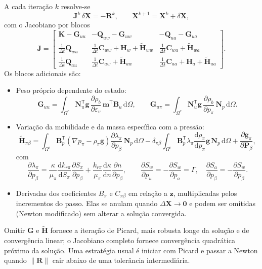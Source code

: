 \documentclass[11pt,a4paper]{article}
\numberwithin{equation}{section}
\newcommand{\dd}{\mathrm{d}}
\begin{document}
A cada iteração $k$ resolve-se
\begin{equation}
\boxed{\mathbf J^{k}\,\delta\mathbf X=-\mathbf R^{k},\qquad
\mathbf X^{k+1}=\mathbf X^{k}+\delta\mathbf X,}
\end{equation}
com o Jacobiano por blocos
\begin{equation}
\boxed{\mathbf J=\begin{bmatrix}
\mathbf K-\mathbf G_{uu}&-\mathbf Q_{uw}-\mathbf G_{uw}&-\mathbf Q_{ua}-\mathbf G_{ua}\\[3pt]
\tfrac{1}{\Delta t}\mathbf Q_{wu}&\tfrac{1}{\Delta t}\mathbf C_{ww}+\mathbf H_w+\tilde{\mathbf H}_{ww}&\tfrac{1}{\Delta t}\mathbf C_{wa}+\tilde{\mathbf H}_{wa}\\[3pt]
\tfrac{1}{\Delta t}\mathbf Q_{au}&\tfrac{1}{\Delta t}\mathbf C_{aw}+\tilde{\mathbf H}_{aw}&\tfrac{1}{\Delta t}\mathbf C_{aa}+\mathbf H_a+\tilde{\mathbf H}_{aa}
\end{bmatrix}.}
\end{equation}
Os blocos adicionais são:
\begin{itemize}
\item Peso próprio dependente do estado:
\begin{equation}
\mathbf G_{uu}=\int_{\Omega^e}\mathbf N_u^{\mathsf T}\mathbf g\,
\frac{\partial\rho_b}{\partial\varepsilon_v}\,\mathbf m^{\mathsf T}\mathbf B_u\,\dd\Omega,\qquad
\mathbf G_{u\pi}=\int_{\Omega^e}\mathbf N_u^{\mathsf T}\mathbf g\,
\frac{\partial\rho_b}{\partial p_\pi}\,\mathbf N_p\,\dd\Omega .
\end{equation}
\item Variação da mobilidade e da massa específica com a pressão:
\begin{equation}
\tilde{\mathbf H}_{\pi\beta}=\int_{\Omega^e}\mathbf B_p^{\mathsf T}
\left(\nabla p_\pi-\rho_\pi\mathbf g\right)\frac{\partial\lambda_\pi}{\partial p_\beta}\,\mathbf N_p\,\dd\Omega
-\delta_{\pi\beta}\int_{\Omega^e}\mathbf B_p^{\mathsf T}\lambda_\pi\frac{\dd\rho_\pi}{\dd p_\pi}\mathbf g\,\mathbf N_p\,\dd\Omega
+\frac{\partial\mathbf g_\pi}{\partial\mathbf P_\beta},
\end{equation}
com
\begin{equation}
\frac{\partial\lambda_\pi}{\partial p_\beta}
=\frac{\kappa}{\mu_\pi}\frac{\dd k_{r\pi}}{\dd S_\pi}\frac{\partial S_\pi}{\partial p_\beta}
+\frac{k_{r\pi}}{\mu_\pi}\frac{\dd\kappa}{\dd n}\frac{\partial n}{\partial p_\beta},
\qquad
\frac{\partial S_w}{\partial p_w}=-\frac{\partial S_w}{\partial p_a}=\Gamma,\quad
\frac{\partial S_a}{\partial p_\beta}=-\frac{\partial S_w}{\partial p_\beta}.
\end{equation}
\item Derivadas dos coeficientes $B_\pi$ e $C_{\pi\beta}$ em relação a
$\mathbf z$, multiplicadas pelos incrementos do passo. Elas se anulam
quando $\Delta\mathbf X\to\mathbf 0$ e podem ser omitidas
(Newton modificado) sem alterar a solução convergida.
\end{itemize}
Omitir $\mathbf G$ e $\tilde{\mathbf H}$ fornece a iteração de Picard, mais
robusta longe da solução e de convergência linear; o Jacobiano completo
fornece convergência quadrática próximo da solução. Uma estratégia usual
é iniciar com Picard e passar a Newton quando $\|\mathbf R\|$ cair abaixo
de uma tolerância intermediária.
\end{document}
